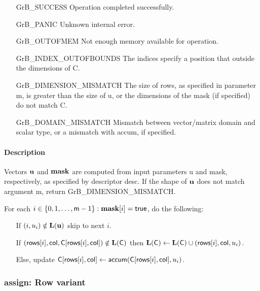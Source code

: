 \begin{itemize}[leftmargin=2.1in]
\item[{\sf GrB\_SUCCESS}]             Operation completed successfully.
\item[{\sf GrB\_PANIC}]               Unknown internal error.
\item[{\sf GrB\_OUTOFMEM}]            Not enough memory available for operation.
\item[{\sf GrB\_INDEX\_OUTOFBOUNDS}]  The indices specify a position that outside the dimensions of {\sf C}.
\item[{\sf GrB\_DIMENSION\_MISMATCH}] 
        The size of {\sf rows}, as specified in parameter {\sf m}, is greater than the size of {\sf u}, or
        the dimensions of the mask (if specified) do not match {\sf C}.
\item[{\sf GrB\_DOMAIN\_MISMATCH}]    Mismatch between vector/matrix domain and scalar type,
                                      or a mismatch with {\sf accum}, if specified.
\end{itemize}

\paragraph{Description}

Vectors ${\bf u}$ and ${\bf mask}$ are computed from input parameters {\sf u} and {\sf mask}, respectively,
as specified by descriptor {\sf desc}. If the shape of ${\bf u}$ does not match argument {\sf m},
return {\sf GrB\_DIMENSION\_MISMATCH}.

For each $i \in \{0, 1, \ldots, {\sf m}-1 \} : {\bf mask}[i] = {\sf true}$, do the following:
\begin{itemize}
	\item[] If $(i,u_{i}) \notin \bold{L}({\bf u})$ skip to next $i$.
	\item[] If $({\sf rows}[i], {\sf col}, {\sf C}[{\sf rows}[i],{\sf col}]) \notin \bold{L}({\sf C})$ then
	      $\bold{L}({\sf C}) \leftarrow \bold{L}({\sf C}) \cup ({\sf rows}[i],{\sf col},u_{i})$.
	\item[]  Else, update ${\sf C}[{\sf rows}[i],{\sf col}] \leftarrow {\sf accum}({\sf C}[{\sf rows}[i],{\sf col}],u_{i})$.
\end{itemize}


\subsubsection{{\sf assign}: Row variant}


